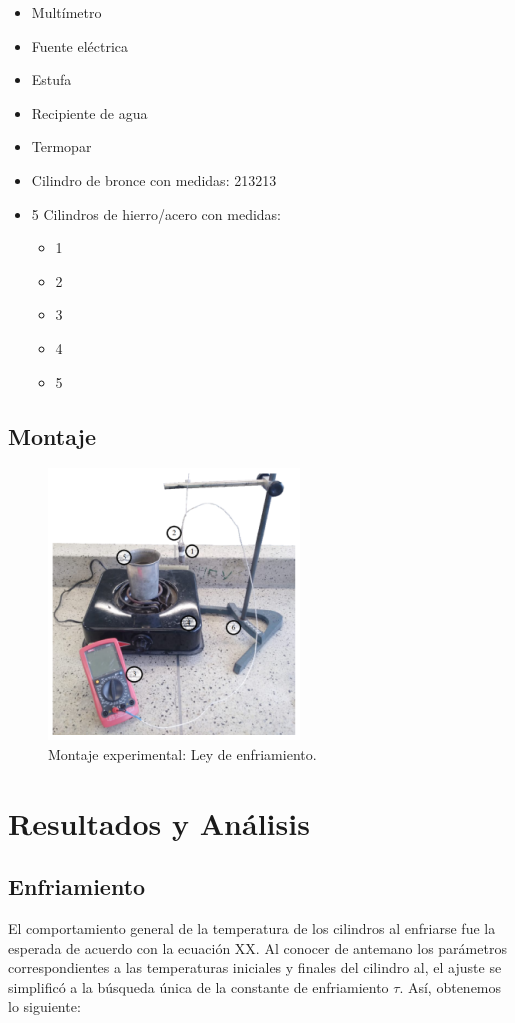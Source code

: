 \documentclass{article}
\begin{document}
\begin{multicols}{2}
\begin{itemize}
    \item Multímetro
    \item Fuente eléctrica 
    \item Estufa
    \item Recipiente de agua
    \item Termopar
    \item Cilindro de bronce con medidas:
        213213
    \item 5 Cilindros de hierro/acero con medidas: 
        \begin{itemize}
        \item 1
        \item 2
        \item 3
        \item 4
        \item 5
        \end{itemize}
\end{itemize}
\end{multicols}

\subsection{Montaje}

\begin{figure}[H]
    \centering
    \includegraphics{media/Montaje.png}
    \caption{Montaje experimental: Ley de enfriamiento.}

    
\end{figure}


\section{Resultados y Análisis}
\subsection{Enfriamiento}
El comportamiento general de la temperatura de los cilindros al enfriarse fue la esperada de acuerdo con la ecuación XX. Al conocer de antemano los parámetros correspondientes a las temperaturas iniciales y finales del cilindro al, el ajuste se simplificó a la búsqueda única de la constante de enfriamiento $\tau$. Así, obtenemos lo siguiente:
\end{document}
